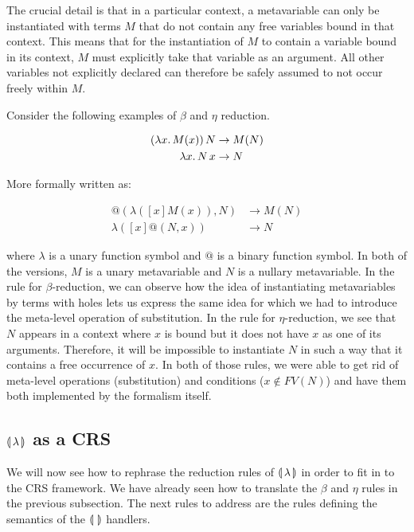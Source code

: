 The crucial detail is that in a particular context, a metavariable can only
be instantiated with terms $M$ that do not contain any free variables bound
in that context. This means that for the instantiation of $M$ to contain a
variable bound in its context, $M$ must explicitly take that variable as an
argument. All other variables not explicitly declared can therefore be
safely assumed to not occur freely within $M$.

Consider the following examples of $\beta$ and $\eta$ reduction.

\begin{align*}
  (\lambda x.\, M(x))\,N & \to M(N) \\
  \lambda x.\, N\,x & \to N
\end{align*}

More formally written as:

\begin{align*}
  @(\lambda([x]M(x)),N) & \to M(N) \\
  \lambda([x]@(N,x)) & \to N
\end{align*}

where $\lambda$ is a unary function symbol and $@$ is a binary function
symbol. In both of the versions, $M$ is a unary metavariable and $N$ is a
nullary metavariable. In the rule for $\beta$-reduction, we can observe how
the idea of instantiating metavariables by terms with holes lets us express
the same idea for which we had to introduce the meta-level operation of
substitution. In the rule for $\eta$-reduction, we see that $N$ appears in
a context where $x$ is bound but it does not have $x$ as one of its
arguments. Therefore, it will be impossible to instantiate $N$ in such a
way that it contains a free occurrence of $x$. In both of those rules, we
were able to get rid of meta-level operations (substitution) and conditions
($x \notin FV(N)$) and have them both implemented by the formalism itself.


\subsection{\texorpdfstring{$\llparenthesis \, \lambda \, \rrparenthesis$}{Our Calculus} as a CRS}
\label{ssec:banana-as-crs}

We will now see how to rephrase the reduction rules of $\llparenthesis \, \lambda \, \rrparenthesis$ in
order to fit in to the CRS framework. We have already seen how to translate
the $\beta$ and $\eta$ rules in the previous subsection. The next
rules to address are the rules defining the semantics of the $\llparenthesis \,  \, \rrparenthesis$
handlers.


